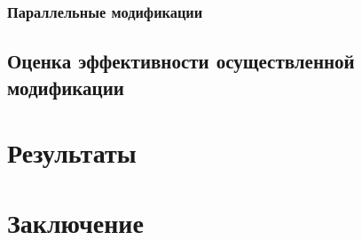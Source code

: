 \documentclass{matmex-diploma-custom}
\begin{document}
\subsubsection{Параллельные модификации}
\subsection{Оценка эффективности осуществленной модификации}
\section{Результаты}
\section*{Заключение}



\end{document}
